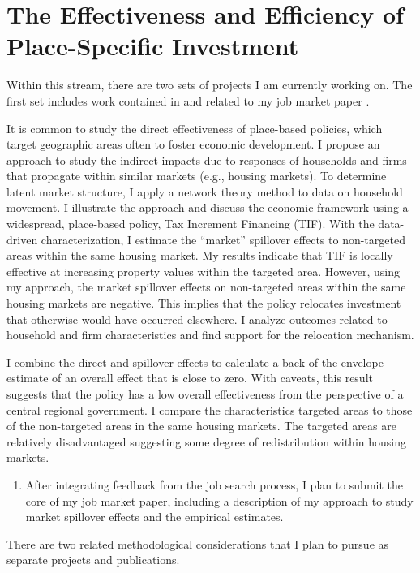 \section{The Effectiveness and Efficiency of Place-Specific Investment}

Within this stream, there are two sets of projects I am currently working on. The first set includes work contained in and related to my job market paper \citep{ziff_locally_2023}. 

It is common to study the direct effectiveness of place-based policies, which target geographic areas often to foster economic development. I propose an approach to study the indirect impacts due to responses of households and firms that propagate within similar markets (e.g., housing markets). To determine latent market structure, I apply a network theory method to data on household movement. I illustrate the approach and discuss the economic framework using a widespread, place-based policy, Tax Increment Financing (TIF). With the data-driven characterization, I estimate the ``market'' spillover effects to non-targeted areas within the same housing market. My results indicate that TIF is locally effective at increasing property values within the targeted area. However, using my approach, the market spillover effects on non-targeted areas within the same housing markets are negative. This implies that the policy relocates investment that otherwise would have occurred elsewhere. I analyze outcomes related to household and firm characteristics and find support for the relocation mechanism. 

I combine the direct and spillover effects to calculate a back-of-the-envelope estimate of an overall effect that is close to zero. With caveats, this result suggests that the policy has a low overall effectiveness from the perspective of a central regional government. I compare the characteristics targeted areas to those of the non-targeted areas in the same housing markets. The targeted areas are relatively disadvantaged suggesting some degree of redistribution within housing markets. 

\begin{enumerate}
\item After integrating feedback from the job search process, I plan to submit the core of my job market paper, including a description of my approach to study market spillover effects and the empirical estimates.
\end{enumerate}

There are two related methodological considerations that I plan to pursue as separate projects and publications.

